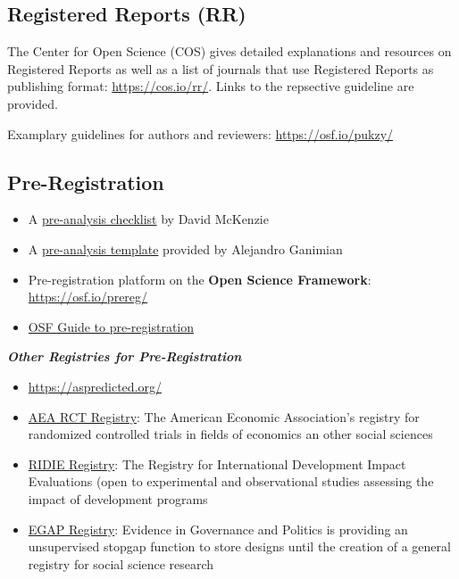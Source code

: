 \documentclass[12pt,]{report}
\providecommand{\tightlist}{%
  \setlength{\itemsep}{0pt}\setlength{\parskip}{0pt}}
\begin{document}
\subsection{Registered Reports (RR)}\label{registered-reports-rr}

The Center for Open Science (COS) gives detailed explanations and
resources on Registered Reports as well as a list of journals that use
Registered Reports as publishing format: \url{https://cos.io/rr/}. Links
to the repsective guideline are provided.

Examplary guidelines for authors and reviewers:
\url{https://osf.io/pukzy/}

\subsection{Pre-Registration}\label{pre-registration}

\begin{itemize}
\tightlist
\item
  A
  \href{http://blogs.worldbank.org/impactevaluations/a-pre-analysis-plan-checklist}{pre-analysis
  checklist} by David McKenzie
\item
  A
  \href{http://cega.berkeley.edu/assets/cega_events/92/Pre-Analysis_Plan_Template_Alejandro_Ganimian.pdf}{pre-analysis
  template} provided by Alejandro Ganimian
\item
  Pre-registration platform on the \textbf{Open Science Framework}:
  \url{https://osf.io/prereg/}
\item
  \href{http://help.osf.io/m/registrations/l/546603-enter-the-preregistration-challenge}{OSF
  Guide to pre-registration}
\end{itemize}

\textbf{\emph{Other Registries for Pre-Registration}}

\begin{itemize}
\tightlist
\item
  \url{https://aspredicted.org/}
\item
  \href{https://www.socialscienceregistry.org/}{AEA RCT Registry}: The
  American Economic Association's registry for randomized controlled
  trials in fields of economics an other social sciences
\item
  \href{http://ridie.3ieimpact.org/}{RIDIE Registry}: The Registry for
  International Development Impact Evaluations (open to experimental and
  observational studies assessing the impact of development programs
\item
  \href{http://egap.org/content/registration}{EGAP Registry}: Evidence
  in Governance and Politics is providing an unsupervised stopgap
  function to store designs until the creation of a general registry for
  social science research
\end{itemize}
\end{document}
